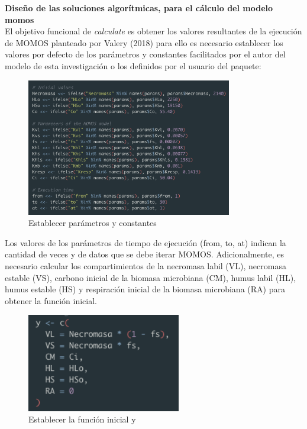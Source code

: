 \noindent
\textbf{Diseño de las soluciones algor\'itmicas, para el c\'alculo del modelo momos}\\

El objetivo funcional de \textit{calculate} es obtener los valores resultantes de la ejecuci\'on de MOMOS planteado por Valery (2018) para ello es necesario establecer los valores por defecto de los par\'ametros y constantes facilitados por el autor del modelo de esta investigaci\'on o los definidos por el usuario del paquete:

\begin{figure}[H]
  \centering
    \begin{minipage}{0.8\textwidth}
      \centering
      \includegraphics[width=0.8\textwidth]{figure_4_9.png}
      \caption{Establecer par\'ametros y constantes}
      \label{fig:Fig}
    \end{minipage}%
    \hspace{5mm}
\end{figure}

Los valores de los par\'ametros de tiempo de ejecuci\'on (from, to, at) indican la cantidad de veces y de datos que se debe iterar MOMOS. Adicionalmente, es necesario calcular los compartimientos de la necromasa labil (VL), necromasa estable (VS), carbono inicial de la biomasa microbiana (CM), humus labil (HL), humus estable (HS) y respiraci\'on inicial de la biomasa microbiana (RA) para obtener la funci\'on inicial.\\

\begin{figure}[H]
  \centering
    \begin{minipage}{0.6\textwidth}
      \centering
      \includegraphics[width=0.6\textwidth]{figure_4_10.png}
      \caption{Establecer la funci\'on inicial y}
      \label{fig:Fig}
    \end{minipage}%
    \hspace{5mm}
\end{figure}

